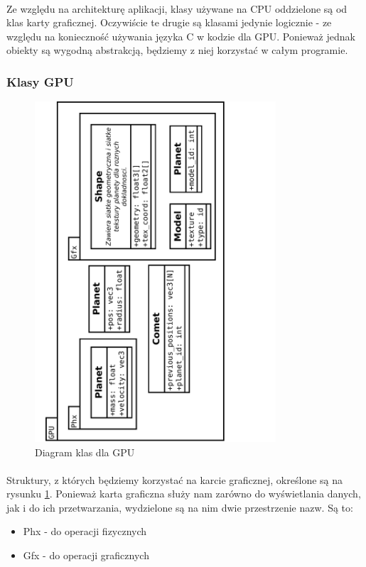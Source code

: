 \paragraph{}
Ze względu na architekturę aplikacji, klasy używane na CPU oddzielone są od klas karty graficznej. Oczywiście te drugie są klasami jedynie logicznie - ze względu na konieczność używania języka C w kodzie dla GPU. Ponieważ jednak obiekty są wygodną abstrakcją, będziemy z niej korzystać w całym programie.

\subsubsection{Klasy GPU}

\begin{figure}[h]
	\centering
	\includegraphics[angle=270,width=0.8\textwidth]{class_gpu.pdf}
	\caption{Diagram klas dla GPU}
	\label{fig:class_gpu}
\end{figure}

\paragraph{}
Struktury, z których będziemy korzystać na karcie graficznej, określone są na rysunku \ref{fig:class_gpu}. Ponieważ karta graficzna służy nam zarówno do wyświetlania danych, jak i do ich przetwarzania, wydzielone są na nim dwie przestrzenie nazw. Są to:
\begin{itemize}
	\item{Phx - do operacji fizycznych}
	\item{Gfx - do operacji graficznych}
\end{itemize}

